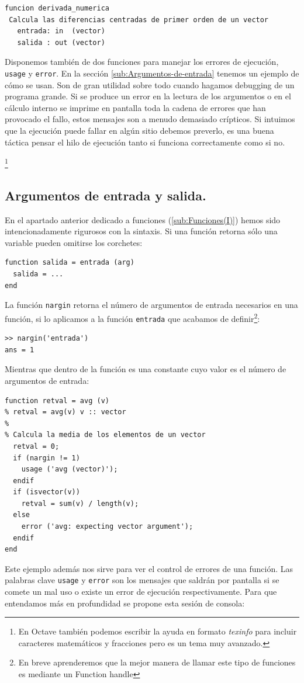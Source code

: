 \begin{lstlisting}
funcion derivada_numerica   
 Calcula las diferencias centradas de primer orden de un vector   
   entrada: in  (vector)   
   salida : out (vector)
\end{lstlisting}

Disponemos también de dos funciones para manejar los errores de
ejecución, \texttt{usage} y \texttt{error}. En la sección
\ref{sub:Argumentos-de-entrada} tenemos un ejemplo de cómo se usan.
Son de gran utilidad sobre todo cuando hagamos debugging de un
programa grande. Si se produce un error en la lectura de los
argumentos o en el cálculo interno se imprime en pantalla toda la
cadena de errores que han provocado el fallo, estos mensajes son a
menudo demasiado crípticos. Si intuimos que la ejecución puede fallar
en algún sitio debemos preverlo, es una buena táctica pensar el hilo
de ejecución tanto si funciona correctamente como si no.

%
\footnote{En Octave también podemos escribir la ayuda en formato
  \emph{texinfo} para incluir caracteres matemáticos y fracciones pero
  es un tema muy avanzado.%
}


\subsection{Argumentos de entrada y
  salida.\label{sub:Argumentos-de-entrada}}

En el apartado anterior dedicado a funciones (\ref{sub:Funciones(I)})
hemos sido intencionadamente rigurosos con la sintaxis. Si una función
retorna sólo una variable pueden omitirse los corchetes:

\begin{lstlisting}
function salida = entrada (arg)
  salida = ...
end
\end{lstlisting}
La función \texttt{nargin} retorna el número de
argumentos de entrada necesarios en una función, si lo aplicamos a la
función \texttt{entrada} que acabamos de definir\footnote{En breve
  aprenderemos que la mejor manera de llamar este tipo de funciones es
  mediante un Function handle}:

\begin{lstlisting}
>> nargin('entrada')
ans = 1
\end{lstlisting}
Mientras que dentro de la función es una constante cuyo valor es el
número de argumentos de entrada:

\begin{lstlisting}
function retval = avg (v)
% retval = avg(v) v :: vector
%
% Calcula la media de los elementos de un vector
  retval = 0;
  if (nargin != 1)
    usage ('avg (vector)');
  endif
  if (isvector(v))
    retval = sum(v) / length(v);
  else
    error ('avg: expecting vector argument');
  endif
end
\end{lstlisting}
Este ejemplo además nos sirve para ver el control de errores de una
función. Las palabras clave \texttt{usage} y
\texttt{error} son los mensajes que saldrán por pantalla
si se comete un mal uso o existe un error de ejecución
respectivamente. Para que entendamos más en profundidad se propone
esta sesión de consola:

